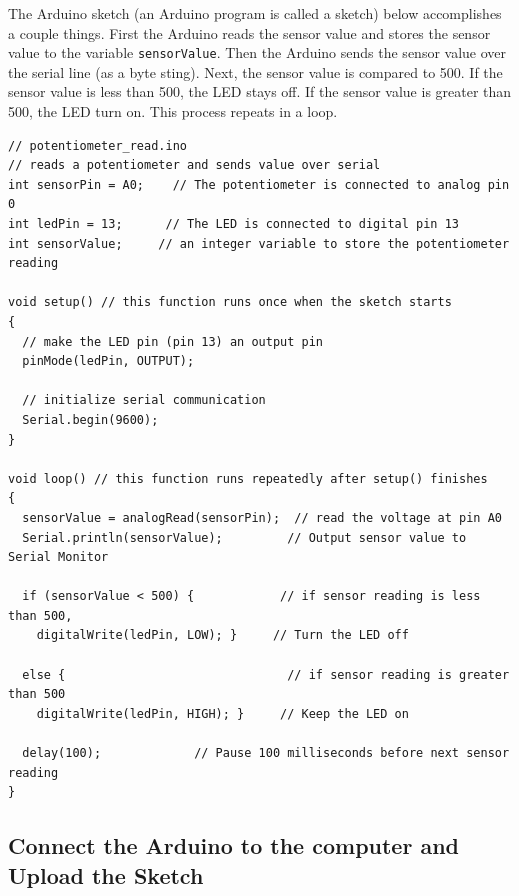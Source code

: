 \documentclass{book}
\begin{document}
The Arduino sketch (an Arduino program is called a sketch) below
accomplishes a couple things. First the Arduino reads the sensor value
and stores the sensor value to the variable \lstinline!sensorValue!.
Then the Arduino sends the sensor value over the serial line (as a byte
sting). Next, the sensor value is compared to 500. If the sensor value
is less than 500, the LED stays off. If the sensor value is greater than
500, the LED turn on. This process repeats in a loop.
    




    
        \begin{lstlisting}
// potentiometer_read.ino
// reads a potentiometer and sends value over serial
int sensorPin = A0;    // The potentiometer is connected to analog pin 0                  
int ledPin = 13;      // The LED is connected to digital pin 13
int sensorValue;     // an integer variable to store the potentiometer reading

void setup() // this function runs once when the sketch starts
{
  // make the LED pin (pin 13) an output pin
  pinMode(ledPin, OUTPUT);

  // initialize serial communication
  Serial.begin(9600);
}

void loop() // this function runs repeatedly after setup() finishes
{
  sensorValue = analogRead(sensorPin);  // read the voltage at pin A0   
  Serial.println(sensorValue);         // Output sensor value to Serial Monitor
  
  if (sensorValue < 500) {            // if sensor reading is less than 500,
    digitalWrite(ledPin, LOW); }     // Turn the LED off
  
  else {                               // if sensor reading is greater than 500
    digitalWrite(ledPin, HIGH); }     // Keep the LED on
  
  delay(100);             // Pause 100 milliseconds before next sensor reading
}
\end{lstlisting}
    




    
        \subsection{Connect the Arduino to the computer and Upload the
Sketch}\label{connect-the-arduino-to-the-computer-and-upload-the-sketch}
    
\end{document}
